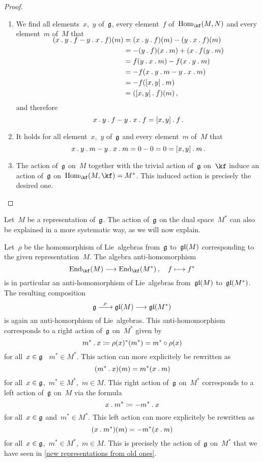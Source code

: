 \begin{proof}
\begin{enumerate}
		\item
			We find all elements~$x$,~$y$ of~$\mathfrak{g}$, every element~$f$ of~$\Hom_{\kf}(M, N)$ and every element~$m$ of~$M$ that
			\begin{align*}
				\SwapAboveDisplaySkip
				(x \act y \act f - y \act x \act f)(m)
				&=
				(x \act y \act f)(m) - (y \act x \act f)(m)
				\\
				&=
				-(y \act f)(x \act m) + (x \act f(y \act m)
				\\
				&=
				f(y \act x \act m) - f(x \act y \act m)
				\\
				&=
				-f(x \act y \act m - y \act x \act m)
				\\
				&=
				-f([x,y] \act m)
				\\
				&=
				([x,y] \act f)(m)  \,,
			\end{align*}
			and therefore
			\[
				x \mathbin{.} y \mathbin{.} f - y \mathbin{.} x \mathbin{.} f
				=
				[x,y] \mathbin{.} f \,.
			\]
		\item
			It holds for all element~$x$,~$y$ of~$\mathfrak{g}$ and every element~$m$ of~$M$ that
			\[
				x \mathbin{.} y \mathbin{.} m - y \mathbin{.} x \mathbin{.} m
				=
				0 - 0
				=
				0
				=
				[x,y] \mathbin{.} m \,.
			\]
		\item
			The action of~$\mathfrak{g}$ on~$M$ together with the trivial action of~$\mathfrak{g}$ on~$\kf$ induce an action of~$\mathfrak{g}$ on~$\Hom_{\kf}(M, \kf) = M^*$.
			This induced action is precisely the desired one.
		\qedhere
	\end{enumerate}
\end{proof}


\begin{remark}
	Let~$M$ be a representation of~$\mathfrak{g}$.
	The action of~$\mathfrak{g}$ on the dual space~$M^*$ can also be explained in a more systematic way, as we will now explain.

	Let~$\rho$ be the homomorphism of Lie~algebras from~$\mathfrak{g}$ to~$\mathfrak{gl}(M)$ corresponding to the given representation~$M$.
	The algebra anti-homomorphism
	\[
		\End_{\kf}(M)
		\to
		\End_{\kf}(M^*) \,,
		\quad
		f
		\mapsto
		f^*
	\]
	is in particular an anti-homomorphism of Lie~algebras from~$\mathfrak{gl}(M)$ to~$\mathfrak{gl}(M^*)$.
	The resulting composition
	\[
		\glie
		\xto{\rho}
		\gllie(M)
		\to
		\gllie(M^*)
	\]
	is again an anti-homorphism of Lie~algebras.
	This anti-homomorphism corresponds to a right action of~$\mathfrak{g}$ on~$M^*$ given by
	\[
		m^* \mathbin{.} x
		\coloneqq
		\rho(x)^*(m^*)
		=
		m^* \circ \rho(x)
	\]
	for all~$x \in \mathfrak{g}$ ~$m^* \in M^*$.
	This action can more explicitely be rewritten as
	\[
		(m^* \mathbin{.} x)(m)
		=
		m^*(x \mathbin{.} m)
	\]
	for all~$x \in \mathfrak{g}$,~$m^* \in M^*$,~$m \in M$.
	This right action of~$\mathfrak{g}$ on~$M^*$ corresponds to a left action of~$\mathfrak{g}$ on~$M$ via the formula
	\[
		x \mathbin{.} m^*
		\coloneqq
		-m^* \mathbin{.} x
	\]
	for all~$x \in \mathfrak{g}$ and~$m^* \in M^*$.
	This left action can more explicitely be rewritten as
	\[
		(x \mathbin{.} m^*)(m)
		=
		-m^*(x \mathbin{.} m)
	\]
	for all~$x \in \mathfrak{g}$,~$m^* \in M^*$,~$m \in M$.
	This is precisely the action of~$\mathfrak{g}$ on~$M^*$ that we have seen in \cref{new representations from old ones}.
\end{remark}


